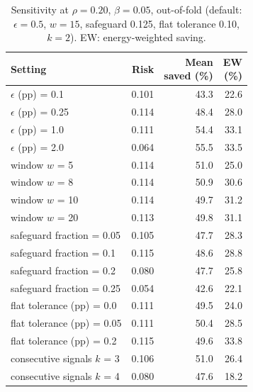 \documentclass[3p,twocolumn,10pt]{elsarticle}
\theoremstyle{definition}
\begin{document}
\begin{table}[t]
\centering
\caption{Sensitivity at $\rho=0.20$, $\beta=0.05$, out-of-fold (default: $\epsilon{=}0.5$, $w{=}15$, safeguard 0.125, flat tolerance 0.10, $k{=}2$). EW: energy-weighted saving.}
\label{tab:sens}
\footnotesize
\begin{adjustbox}{max width=\columnwidth}
\begin{tabular}{p{3.6cm}rrr}
\toprule
Setting & Risk & \shortstack{Mean\\saved (\%)} & \shortstack{EW\\(\%)} \\
\midrule
$\epsilon$ (pp) = 0.1 & 0.101 & 43.3 & 22.6 \\
$\epsilon$ (pp) = 0.25 & 0.114 & 48.4 & 28.0 \\
$\epsilon$ (pp) = 1.0 & 0.111 & 54.4 & 33.1 \\
$\epsilon$ (pp) = 2.0 & 0.064 & 55.5 & 33.5 \\
\midrule
window $w$ = 5 & 0.114 & 51.0 & 25.0 \\
window $w$ = 8 & 0.114 & 50.9 & 30.6 \\
window $w$ = 10 & 0.114 & 49.7 & 31.2 \\
window $w$ = 20 & 0.113 & 49.8 & 31.1 \\
\midrule
safeguard fraction = 0.05 & 0.105 & 47.7 & 28.3 \\
safeguard fraction = 0.1 & 0.115 & 48.6 & 28.8 \\
safeguard fraction = 0.2 & 0.080 & 47.7 & 25.8 \\
safeguard fraction = 0.25 & 0.054 & 42.6 & 22.1 \\
\midrule
flat tolerance (pp) = 0.0 & 0.111 & 49.5 & 24.0 \\
flat tolerance (pp) = 0.05 & 0.111 & 50.4 & 28.5 \\
flat tolerance (pp) = 0.2 & 0.115 & 49.6 & 33.8 \\
\midrule
consecutive signals $k$ = 3 & 0.106 & 51.0 & 26.4 \\
consecutive signals $k$ = 4 & 0.080 & 47.6 & 18.2 \\
\bottomrule
\end{tabular}
\end{adjustbox}
\end{table}
\end{document}
